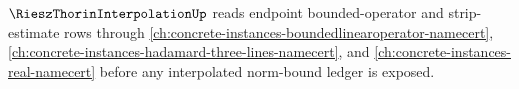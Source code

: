 $\RieszThorinInterpolationUp$ reads endpoint bounded-operator and strip-estimate rows through \autoref{ch:concrete-instances-boundedlinearoperator-namecert}, \autoref{ch:concrete-instances-hadamard-three-lines-namecert}, and \autoref{ch:concrete-instances-real-namecert} before any interpolated norm-bound ledger is exposed.



